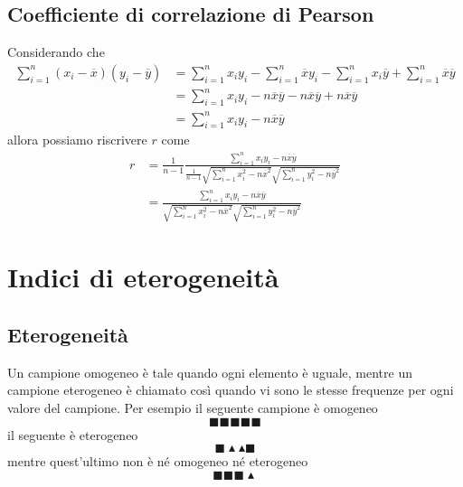 \documentclass[11pt]{report}
\begin{document}
\subsection{Coefficiente di correlazione di Pearson}
Considerando che
\begin{equation}
    \begin{split}
        \sum_{i=1}^{n}(x_i - \overline{x})(y_i - \overline{y}) & = \sum_{i=1}^{n}x_iy_i - \sum_{i=1}^{n}\overline{x}y_i - \sum_{i=1}^{n}x_i\overline{y} + \sum_{i=1}^{n}\overline{x}\overline{y}\\
        & = \sum_{i=1}^{n}x_iy_i - n\overline{x}\overline{y} - n\overline{x}\overline{y} + n\overline{x}\overline{y}\\
        & = \sum_{i=1}^{n}x_iy_i - n\overline{x}\overline{y}
    \end{split}
\end{equation}
allora possiamo riscrivere $r$ come
\begin{equation}
    \begin{split}
        r & = \frac{1}{n-1}\frac{\sum_{i=1}^{n}x_iy_i - n\overline{x}\overline{y}}{\frac{1}{n-1}\sqrt{\sum_{i=1}^{n}x_i^2 - n\overline{x}^2}\sqrt{\sum_{i=1}^{n}y_i^2 - n\overline{y}^2}}\\
        & = \frac{\sum_{i=1}^{n}x_iy_i - n\overline{x}\overline{y}}{\sqrt{\sum_{i=1}^{n}x_i^2 - n\overline{x}^2}\sqrt{\sum_{i=1}^{n}y_i^2 - n\overline{y}^2}}
    \end{split}
\end{equation}

\section{Indici di eterogeneità}
\subsection{Eterogeneità}
Un campione omogeneo è tale quando ogni elemento è uguale, mentre un campione eterogeneo è chiamato così quando vi sono le stesse frequenze per ogni valore del campione. Per esempio il seguente campione è omogeneo
$$\blacksquare \blacksquare \blacksquare \blacksquare \blacksquare$$
il seguente è eterogeneo
$$\blacksquare \blacktriangle \blacktriangle \blacksquare$$
mentre quest'ultimo non è né omogeneo né eterogeneo
$$\blacksquare \blacksquare \blacksquare \blacktriangle$$
\end{document}
